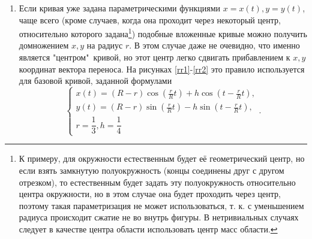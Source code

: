 \documentclass[a4paper, 12pt]{article}
\begin{document}
\begin{enumerate}
  \item Если кривая уже задана параметрическими функциями $x=x(t),y=y(t)$,
  чаще всего (кроме случаев, когда она проходит через некоторый центр,
  относительно которого задана\footnote{К примеру, для окружности естественным будет её геометрический центр, но если взять замкнутую полуокружность (концы соединены друг с другом отрезком), то естественным будет задать эту полуокружность относительно центра окружности, но в этом случае она будет проходить через центр, поэтому такая параметризация не может использоваться, т. к. с уменьшением радиуса происходит сжатие не во внутрь фигуры. В нетривиальных случаях следует в качестве центра области использовать центр масс области.}) подобные вложенные кривые можно получить домножением $x,y$ на радиус $r$.
  В этом случае даже не очевидно, что именно является "центром"\ кривой, но этот центр легко сдвигать прибавлением к $x,y$ координат вектора переноса.
  На рисунках \ref{rr1}-\ref{rr2} это правило используется для базовой кривой, заданной формулами
\[
\begin{cases}
  x(t)=(R-r)\cos\left(\frac{r}{R}t\right)+h \cos \left(t-\frac{r}{R}t\right),\\
  y(t)=(R-r)\sin\left(\frac{r}{R}t\right)-h \sin \left(t-\frac{r}{R}t\right),\\
  r=\dfrac{1}{3}, h=\dfrac{1}{4}
\end{cases}.  
\]


\end{enumerate}
\end{document}
